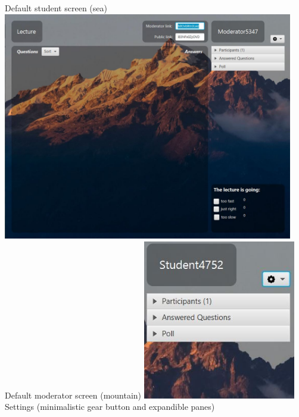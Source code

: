 \documentclass{article}
\begin{document}
\begin{center}
    Default student screen (sea)
    \vfill
    \includegraphics[width=0.95\textwidth]{moderator_screen.JPG}
    Default moderator screen (mountain)
    \clearpage
    \label{settings}
    \includegraphics[width=0.5\textwidth]{pane_and_settings.JPG}
    \\Settings (minimalistic gear button and expandible panes)
    \clearpage
\end{center}
\printbibliography
\end{document}
